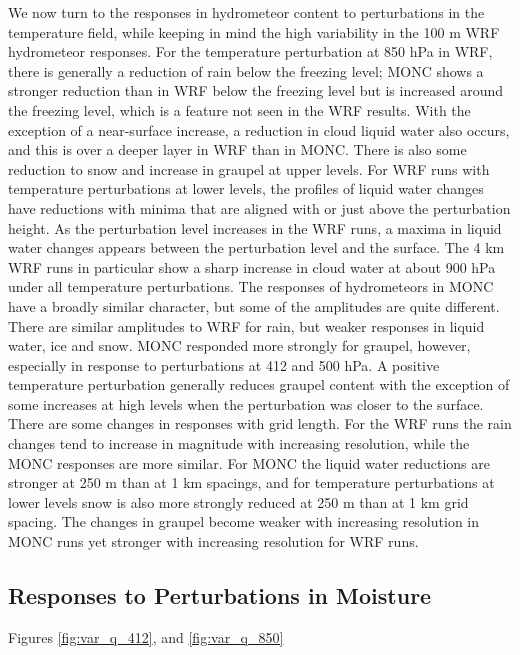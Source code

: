 \documentclass[draft]{agujournal2019}
\begin{document}
We now turn to the responses in hydrometeor content to perturbations in the
temperature field, while keeping in mind the high variability in the 100 m WRF
hydrometeor responses. For the temperature perturbation at 850 hPa in WRF, there
is generally a reduction of rain below the freezing level; MONC shows a stronger
reduction than in WRF below the freezing level but is increased around the
freezing level, which is a feature not seen in the WRF results. With the
exception of a near-surface increase, a reduction in cloud liquid water also
occurs, and this is over a deeper layer in WRF than in MONC. There is also some
reduction to snow and increase in graupel at upper levels. For WRF runs with
temperature perturbations at lower levels, the profiles of liquid water changes
have reductions with minima that are aligned with or just above the perturbation
height. As the perturbation level increases in the WRF runs, a maxima in liquid
water changes appears between the perturbation level and the surface. The 4 km
WRF runs in particular show a sharp increase in cloud water at about 900 hPa
under all temperature perturbations. The responses of hydrometeors in MONC have
a broadly similar character, but some of the amplitudes are quite different.
There are similar amplitudes to WRF for rain, but weaker responses in liquid
water, ice and snow. MONC responded more strongly for graupel, however,
especially in response to perturbations at 412 and 500 hPa. A positive
temperature perturbation generally reduces graupel content with the exception of
some increases at high levels when the perturbation was closer to the surface.
There are some changes in responses with grid length. For the WRF runs the rain
changes tend to increase in magnitude with increasing resolution, while the MONC
responses are more similar. For MONC the liquid water reductions are stronger at
250 m than at 1 km spacings, and for temperature perturbations at lower levels
snow is also more strongly reduced at 250 m than at 1 km grid spacing. The
changes in graupel become weaker with increasing resolution in MONC runs yet
stronger with increasing resolution for WRF runs. 

\subsection{Responses to Perturbations in Moisture}

Figures \ref{fig:var_q_412}, and \ref{fig:var_q_850}
\end{document}
